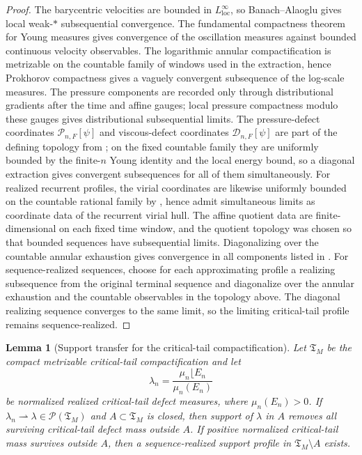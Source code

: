 \documentclass[11pt]{amsart}
\numberwithin{equation}{section}
\theoremstyle{plain}
\newtheorem{lemma}[lemma]{Lemma}
\theoremstyle{definition}
\theoremstyle{remark}
\newcommand{\loc}{\mathrm{loc}}
\newcommand{\Tcrit}{\mathfrak T_M}
\begin{document}
\begin{proof}
The barycentric velocities are bounded in \(L^\infty_{\loc}\), so
Banach--Alaoglu gives local weak-\(*\) subsequential convergence.  The
fundamental compactness theorem for Young measures gives convergence of the
oscillation measures against bounded continuous velocity observables.  The
logarithmic annular compactification is metrizable on the countable family of
windows used in the extraction, hence Prokhorov compactness gives a vaguely
convergent subsequence of the log-scale measures.  The pressure components are
recorded only through distributional gradients after the time and affine gauges;
local pressure compactness modulo these gauges gives distributional
subsequential limits.  The pressure-defect coordinates
\(\mathscr P_{n,F}[\psi]\) and viscous-defect coordinates
\(\mathscr D_{n,F}[\psi]\) are part of the defining topology from
;
on the fixed countable family they are uniformly bounded by the finite-\(n\)
Young identity and the local energy bound, so a diagonal extraction gives
convergent subsequences for all of them simultaneously.  For realized recurrent
profiles, the virial coordinates are likewise uniformly bounded on the
countable rational family by ,
hence admit simultaneous limits as coordinate data of the recurrent virial
hull.  The affine quotient data
are finite-dimensional on each fixed time window, and the quotient topology was
chosen so that bounded sequences have subsequential limits.  Diagonalizing over
the countable annular exhaustion gives convergence in all components listed in
.  For sequence-realized sequences,
choose for each approximating profile a realizing subsequence from the original
terminal sequence and diagonalize over the annular exhaustion and the countable
observables in the topology above.  The diagonal realizing sequence converges
to the same limit, so the limiting critical-tail profile remains
sequence-realized.
\end{proof}

\begin{lemma}[Support transfer for the critical-tail compactification]
\label{lem:critical-tail-support-transfer}
Let \(\Tcrit\) be the compact metrizable critical-tail compactification and let
\[
   \lambda_n=\frac{\mu_n\lfloor E_n}{\mu_n(E_n)}
\]
be normalized realized critical-tail defect measures, where \(\mu_n(E_n)>0\).
If \(\lambda_n\rightharpoonup\lambda\in\mathcal P(\Tcrit)\) and
\(A\subset\Tcrit\) is closed, then support of \(\lambda\) in \(A\) removes all
surviving critical-tail defect mass outside \(A\).  If positive normalized
critical-tail mass survives outside \(A\), then a sequence-realized support
profile in \(\Tcrit\setminus A\) exists.
\end{lemma}
\end{document}
